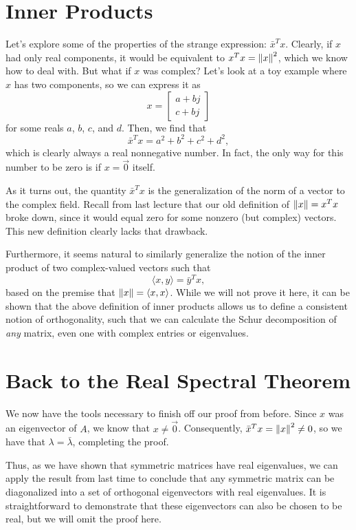 \documentclass[letterpaper]{article}
\theoremstyle{remark}
\newcommand{\mat}[1]{\ensuremath{\begin{bmatrix}#1\end{bmatrix}}}
\begin{document}
\section{Inner Products}
Let's explore some of the properties of the strange expression: $\bar{x}^Tx$. Clearly, if $x$ had only real components, it would be equivalent to $x^Tx = \norm{x}^2$, which we know how to deal with. But what if $x$ was complex? Let's look at a toy example where $x$ has two components, so we can express it as
\[
    x = \mat{a + bj \\ c + bj}
\]
for some reals $a$, $b$, $c$, and $d$. Then, we find that
\[
    \bar{x}^Tx = a^2 + b^2 + c^2 + d^2,
\]
which is clearly always a real nonnegative number. In fact, the only way for this number to be zero is if $x = \vec{0}$ itself.

As it turns out, the quantity $\bar{x}^Tx$ is the generalization of the norm of a vector to the complex field. Recall from last lecture that our old definition of $\norm{x} = x^Tx$ broke down, since it would equal zero for some nonzero (but complex) vectors. This new definition clearly lacks that drawback.

Furthermore, it seems natural to similarly generalize the notion of the inner product of two complex-valued vectors such that
\[
    \langle x, y \rangle = \bar{y}^Tx,
\]
based on the premise that $\norm{x} = \langle x, x \rangle$. While we will not prove it here, it can be shown that the above definition of inner products allows us to define a consistent notion of orthogonality, such that we can calculate the Schur decomposition of \emph{any} matrix, even one with complex entries or eigenvalues.

\section{Back to the Real Spectral Theorem}
We now have the tools necessary to finish off our proof from before. Since $x$ was an eigenvector of $A$, we know that $x \ne \vec{0}$. Consequently, $\bar{x}^Tx = \norm{x}^2 \ne 0$, so we have that $\lambda = \bar{\lambda}$, completing the proof.

Thus, as we have shown that symmetric matrices have real eigenvalues, we can apply the result from last time to conclude that any symmetric matrix can be diagonalized into a set of orthogonal eigenvectors with real eigenvalues. It is straightforward to demonstrate that these eigenvectors can also be chosen to be real, but we will omit the proof here.
\end{document}
